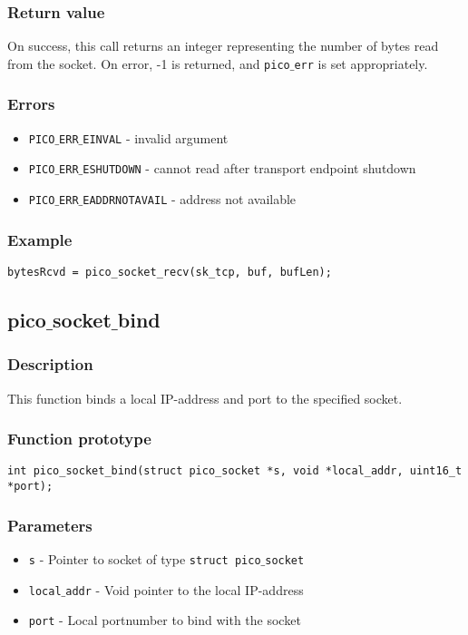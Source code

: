 \subsubsection*{Return value}
On success, this call returns an integer representing the number of bytes read
from the socket. On error, -1 is returned, and \texttt{pico$\_$err} is set appropriately.

\subsubsection*{Errors}
\begin{itemize}[noitemsep]
\item \texttt{PICO$\_$ERR$\_$EINVAL} - invalid argument
\item \texttt{PICO$\_$ERR$\_$ESHUTDOWN} - cannot read after transport endpoint shutdown
\item \texttt{PICO$\_$ERR$\_$EADDRNOTAVAIL} - address not available
\end{itemize}

\subsubsection*{Example}
\begin{verbatim}
bytesRcvd = pico_socket_recv(sk_tcp, buf, bufLen);
\end{verbatim}


\subsection{pico$\_$socket$\_$bind}

\subsubsection*{Description}
This function binds a local IP-address and port to the specified socket.

\subsubsection*{Function prototype}
\begin{verbatim}
int pico_socket_bind(struct pico_socket *s, void *local_addr, uint16_t *port);
\end{verbatim}


\subsubsection*{Parameters}
\begin{itemize}[noitemsep]
\item \texttt{s} - Pointer to socket of type \texttt{struct pico$\_$socket}
\item \texttt{local$\_$addr} - Void pointer to the local IP-address
\item \texttt{port} - Local portnumber to bind with the socket
\end{itemize}

